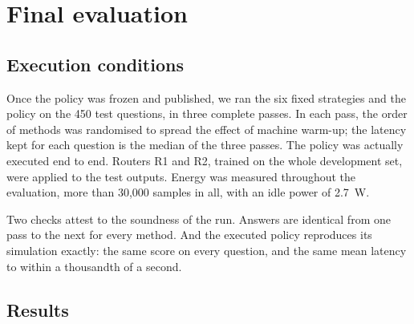 \documentclass[11pt,a4paper]{article}
\begin{document}
\section{Final evaluation}\label{sec:final}

\subsection{Execution conditions}

Once the policy was frozen and published, we ran the six fixed strategies and the policy on the 450 test
questions, in three complete passes. In each pass, the order of methods was randomised to spread the
effect of machine warm-up; the latency kept for each question is the median of the three passes. The
policy was actually executed end to end. Routers R1 and R2, trained on the whole development set, were
applied to the test outputs. Energy was measured throughout the evaluation, more than 30,000 samples in
all, with an idle power of 2.7~W.

Two checks attest to the soundness of the run. Answers are identical from one pass to the next for every
method. And the executed policy reproduces its simulation exactly: the same score on every question, and
the same mean latency to within a thousandth of a second.

\subsection{Results}
\end{document}
